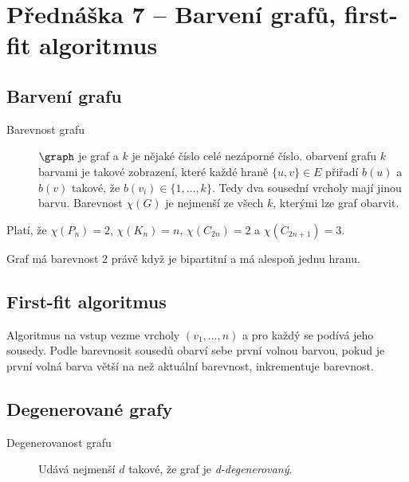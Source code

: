 \section{Přednáška 7 -- Barvení grafů, first-fit algoritmus}

\subsection{Barvení grafu}

\begin{description}
    \item[Barevnost grafu] $\graph$ je graf a $k$ je nějaké číslo celé nezáporné číslo.
    obarvení grafu $k$ barvami je takové zobrazení, které každé hraně $\{u, v\} \in E$ přiřadí $b(u)$ a $b(v)$ takové, že $b(v_i) \in \{1, \dots, k\}$.
    Tedy dva sousední vrcholy mají jinou barvu.
    Barevnost $\chi(G)$ je nejmenší ze všech $k$, kterými lze graf obarvit.
\end{description}

Platí, že $\chi(P_n) = 2$, $\chi(K_n) = n$, $\chi(C_{2n}) = 2$ a $\chi(C_{2n+1}) = 3$.

Graf má barevnost 2 právě když je bipartitní a má alespoň jednu hranu.

\subsection{First-fit algoritmus}

Algoritmus na vstup vezme vrcholy $(v_1, \ldots, n)$ a pro každý se podívá jeho sousedy.
Podle barevnosit sousedů obarví sebe první volnou barvou, pokud je první volná barva větší na než aktuální barevnost, inkrementuje barevnost.

\subsection{Degenerované grafy}


\begin{description}
    \item[Degenerovanost grafu] Udává nejmenší $d$ takové, že graf je \textit{d-degenerovaný}.
\end{description}



